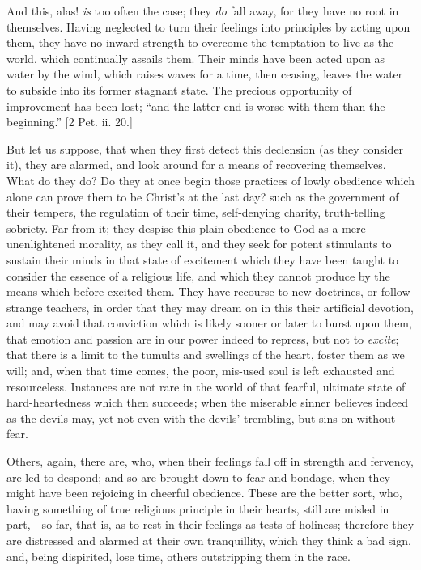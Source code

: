 And this, alas! \emph{is} too often the case; they \emph{do}
fall away, for they have no root in themselves. Having
neglected to turn their feelings into principles by
acting upon them, they have no inward strength to
overcome the temptation to live as the world, which
continually assails them. Their minds have been acted
upon as water by the wind, which raises waves for a time,
then ceasing, leaves the water to subside into its former
stagnant state. The precious opportunity of improvement
has been lost; ``and the latter end is worse with
them than the beginning.'' [2 Pet. ii. 20.]

But let us suppose, that when they first detect this
declension (as they consider it), they are alarmed, and
look around for a means of recovering themselves. What do
they do? Do they at once begin those practices of lowly
obedience which alone can prove them to be Christ's at
the last day? such as the government of their tempers,
the regulation of their time, self-denying charity,
truth-telling sobriety. Far from it; they despise this
plain obedience to God as a mere unenlightened morality,
as they call it, and they seek for potent stimulants to
sustain their minds in that state of excitement which
they have been taught to consider the essence of a
religious life, and which they cannot produce by the
means which before excited them. They have recourse to
new doctrines, or follow strange teachers, in order that
they may dream on in this their artificial devotion, and
may avoid that conviction which is likely sooner or later
to burst upon them, that emotion and passion are in our
power indeed to repress, but not to \emph{excite}; that
there is a limit to the tumults and swellings of the
heart, foster them as we will; and, when that time comes,
the poor, mis-used soul is left exhausted and
resourceless. Instances are not rare in the world of that
fearful, ultimate state of hard-heartedness which then
succeeds; when the miserable sinner believes indeed as
the devils may, yet not even with the devils' trembling,
but sins on without fear.

Others, again, there are, who, when their feelings
fall off in strength and fervency, are led to despond;
and so are brought down to fear and bondage, when they
might have been rejoicing in cheerful obedience. These
are the better sort, who, having something of true
religious principle in their hearts, still are misled in
part,—so far, that is, as to rest in their feelings
as tests of holiness; therefore they are distressed and
alarmed at their own tranquillity, which they think a bad
sign, and, being dispirited, lose time, others
outstripping them in the race.

